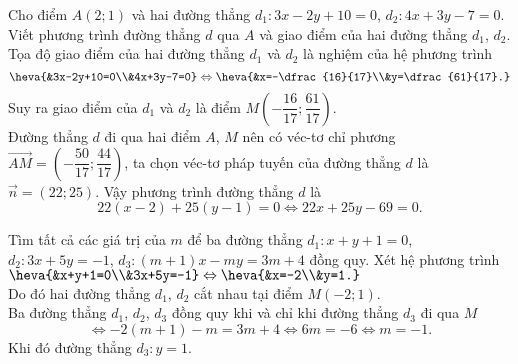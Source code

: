 	\begin{bt}%
		Cho điểm $A(2;1)$ và hai đường thẳng $d_1\colon 3x-2y+10=0$, $d_2\colon 4x+3y-7=0$. Viết phương trình đường thẳng $d$ qua $A$ và giao điểm của hai đường thẳng $d_1$, $d_2$.
		\loigiai
		{Tọa độ giao điểm của hai đường thẳng $d_1$ và $d_2$ là nghiệm của hệ phương trình 
			$$\heva{&3x-2y+10=0\\&4x+3y-7=0} \Leftrightarrow \heva{&x=-\dfrac{16}{17}\\&y=\dfrac{61}{17}.}$$
			Suy ra giao điểm của $d_1$ và $d_2$ là điểm $M\left(-\dfrac{16}{17};\dfrac{61}{17}\right)$.\\
			Đường thẳng $d$ đi qua hai điểm $A$, $M$ nên có véc-tơ chỉ phương $\overrightarrow{AM}=\left(-\dfrac{50}{17};\dfrac{44}{17}\right)$, ta chọn véc-tơ pháp tuyến của đường thẳng $d$ là $\overrightarrow{n}=\left(22;25\right)$. Vậy phương trình đường thẳng $d$ là
			$$22(x-2)+25(y-1)=0 \Leftrightarrow 22x+25y-69=0.$$}
	\end{bt}
	
	\begin{bt}%
		Tìm tất cả các giá trị của $m$ để ba đường thẳng $d_1\colon x+y+1=0$, $d_2\colon 3x+5y=-1$, $d_3\colon (m+1)x-my=3m+4$ đồng quy.
		\loigiai
		{Xét hệ phương trình $\heva{&x+y+1=0\\&3x+5y=-1}\Leftrightarrow \heva{&x=-2\\&y=1.}$\\
			Do đó hai đường thẳng $d_1$, $d_2$ cắt nhau tại điểm $M(-2;1)$.\\
			Ba đường thẳng $d_1$, $d_2$, $d_3$ đồng quy khi và chỉ khi đường thẳng $d_3$ đi qua $M$ 
			$$\Leftrightarrow -2\left(m+1\right)-m=3m+4 \Leftrightarrow 6m=-6 \Leftrightarrow m=-1.$$
			Khi đó đường thẳng $d_3\colon y=1$.}
	\end{bt}
	
